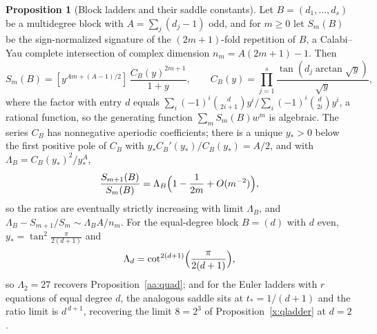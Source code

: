 \documentclass[11pt]{article}
\theoremstyle{definition}
\newtheorem{proposition}{Proposition}
\begin{document}
\begin{proposition}[Block ladders and their saddle constants]\label{aa:blocks}
Let $B=(d_1,\ldots,d_s)$ be a multidegree block with $A=\sum_j(d_j-1)$ odd, and for $m\ge0$ let $S_m(B)$ be the sign-normalized signature of the $(2m+1)$-fold repetition of $B$, a Calabi--Yau complete intersection of complex dimension $n_m=A(2m+1)-1$.  Then
\[
S_m(B)=[y^{Am+(A-1)/2}]\,\frac{C_B(y)^{2m+1}}{1+y},
\qquad
C_B(y)=\prod_{j=1}^s\frac{\tan(d_j\arctan\sqrt y)}{\sqrt y},
\]
where the factor with entry $d$ equals $\sum_i(-1)^i\binom{d}{2i+1}y^i\big/\sum_i(-1)^i\binom{d}{2i}y^i$, a rational function, so the generating function $\sum_mS_m(B)w^m$ is algebraic.  The series $C_B$ has nonnegative aperiodic coefficients; there is a unique $y_{*}>0$ below the first positive pole of $C_B$ with $y_{*}C_B'(y_{*})/C_B(y_{*})=A/2$, and with $\Lambda_B=C_B(y_{*})^2/y_{*}^A$,
\[
\frac{S_{m+1}(B)}{S_m(B)}=\Lambda_B\Bigl(1-\frac1{2m}+O(m^{-2})\Bigr),
\]
so the ratios are eventually strictly increasing with limit $\Lambda_B$, and $\Lambda_B-S_{m+1}/S_m\sim\Lambda_BA/n_m$.  For the equal-degree block $B=(d)$ with $d$ even, $y_{*}=\tan^2\tfrac{\pi}{2(d+1)}$ and
\[
\Lambda_d=\cot^{2(d+1)}\Bigl(\frac{\pi}{2(d+1)}\Bigr),
\]
so $\Lambda_2=27$ recovers Proposition~\ref{aa:quad}; and for the Euler ladders with $r$ equations of equal degree $d$, the analogous saddle sits at $t_{*}=1/(d+1)$ and the ratio limit is $d^{\,d+1}$, recovering the limit $8=2^3$ of Proposition~\ref{x:qladder} at $d=2$.
\end{proposition}
\end{document}
